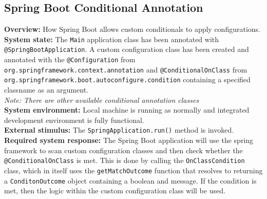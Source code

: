 \subsection*{Spring Boot Conditional Annotation}

\textbf{Overview:} How Spring Boot allows custom conditionals to apply configurations.\\

\textbf{System state:} The \texttt{Main} application class has been annotated with \texttt{@SpringBootApplication}. A custom configuration class has been created and annotated with the \texttt{@Configuration} from \texttt{org.springframework.context.annotation} and \texttt{@ConditionalOnClass} from \texttt{org.springframework.boot.autoconfigure.condition} containing a specified classname as an argument. \\

\textit{Note: There are other available conditional annotation classes}\\

\textbf{System environment:} Local machine is running as normally and integrated development environment is fully functional. \\

\textbf{External stimulus:} The \texttt{SpringApplication.run()} method is invoked. \\

\textbf{Required system response:} The Spring Boot application will use the spring framework to scan custom configuration classes and then check whether the \texttt{@ConditionalOnClass} is met. This is done by calling the \texttt{OnClassCondition} class, which in itself uses the \texttt{getMatchOutcome} function that resolves to returning a \texttt{ConditonOutcome} object containing a boolean and message. If the condition is met, then the logic within the custom configuration class will be used.